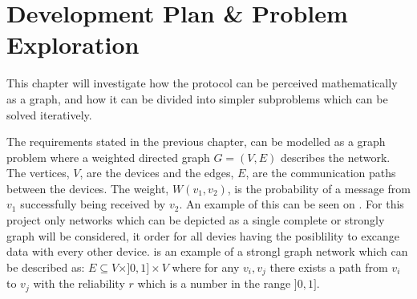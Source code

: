 \chapter{Development Plan \& Problem Exploration}\label{chp:Problems}
This chapter will investigate how the protocol can be perceived mathematically as a graph, and how it can be divided into simpler subproblems which can be solved iteratively.

The requirements stated in the previous chapter, can be modelled as a graph problem where a weighted directed graph $G = (V, E)$ describes the network. 
The vertices, $V$, are the devices and the edges, $E$, are the communication paths between the devices. 
The weight, $W(v_1, v_2)$, is the probability of a message from $v_1$ successfully being received by $v_2$.
An example of this can be seen on .
For this project only networks which can be depicted as a single complete or strongly graph will be considered, it order for all devies having the posiblility to excange data with every other device.
 is an example of a strongl graph network which can be described as: $E \subseteq V \times ]0,1] \times V$ where for any $v_i, v_j$ there exists a path from $v_i$ to $v_j$ with the reliability $r$ which is a number in the range $]0,1]$.


